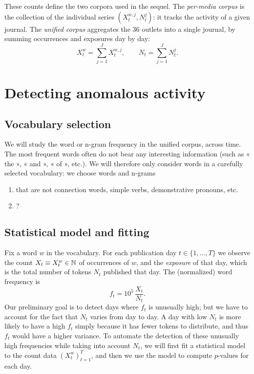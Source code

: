 \documentclass[11pt,a4paper]{article}
\begin{document}
These counts define the two corpora used in the sequel. The \emph{per-media corpus} is the collection of the individual series $(X_t^{w,j}, N_t^j)$: it tracks the activity of a given journal. The \emph{unified corpus} aggregates the 36 outlets into a single journal, by summing occurrences and exposures day by day:
\[
  X_t^w = \sum_{j=1}^{J} X_t^{w,j}, \qquad N_t = \sum_{j=1}^{J} N_t^j.
\]

\section{Detecting anomalous activity}
\label{sec:detection}


\subsection{Vocabulary selection}

We will study the word or n-gram frequency in the unified corpus, across time. The most frequent words often do not bear any interesting information (such as « the », « and », « of », etc.). We will therefore only consider words in a carefully selected vocabulary: we choose words and n-grams 
\begin{enumerate}\item that are not connection words, simple verbs, demonstrative pronouns, etc.
  \item ?
\end{enumerate}

\subsection{Statistical model and fitting}
\label{sec:model}


Fix a word $w$ in the vocabulary. For each publication day $t \in \{1, \dots, T\}$
we observe the count $X_t \equiv X^w_t \in \mathbb{N}$ of occurrences of $w$, and the \emph{exposure} of that day, which is the
total number of tokens $N_t$ published that day. The (normalized) word frequency is 
\[
  f_t = 10^{5}\, \frac{X_t}{N_t}.
\]
Our preliminary goal is to detect days where $f_t$ is unusually high; but we have to account for the fact that $N_t$ varies from day to day. A day with low $N_t$ is more likely to have a high $f_t$ simply because it has fewer tokens to distribute, and thus $f_t$ would have a higher variance. To automate the detection of these unusually high frequencies while taking into account $N_t$, we will first fit a statistical model to the count data $(X_t^w)_{t=1}^T$, and then we use the model to compute $p$-values for each day. 
\end{document}
